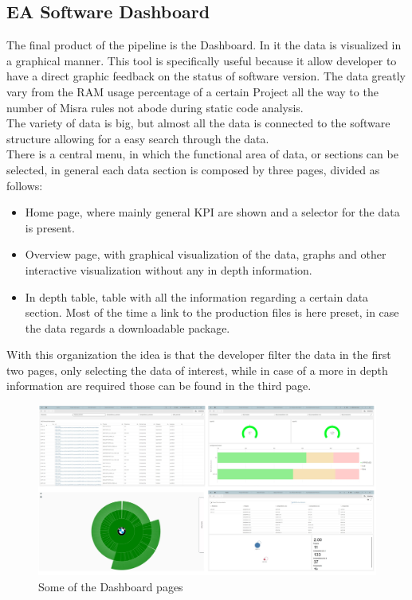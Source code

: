 \documentclass[../main.tex]{subfiles}
\begin{document}
\subsection{EA Software Dashboard}
The final product of the pipeline is the Dashboard. In it the data is visualized in a graphical manner. This tool is specifically useful because it allow developer to have a direct graphic feedback on the status of software version. The data greatly vary from the RAM usage percentage of a certain Project all the way to the number of Misra rules not abode during static code analysis.\\
The variety of data is big, but almost all the data is connected to the software structure allowing for a easy search through the data.\\
There is a central menu, in which the functional area of data, or sections can be selected, in general each data section is composed by three pages, divided as follows:
\begin{itemize}
    \item Home page, where mainly general \gls{KPI} are shown and a selector for the data is present.
    \item Overview page, with graphical visualization of the data, graphs and other interactive visualization without any in depth information.
    \item In depth table, table with all the information regarding a certain data section. Most of the time a link to the production files is here preset, in case the data regards a downloadable package. 
\end{itemize}
With this organization the idea is that the developer filter the data in the first two pages, only selecting the data of interest, while in case of a more in depth information are required those can be found in the third page.  
\begin{figure}[H]
    \centering
    \includegraphics[width=\linewidth]{images_folder/Dashboard.png}
    \caption{Some of the Dashboard pages}
    \label{fig:Dashboardseite}
\end{figure}
\cleardoublepage
\end{document}
